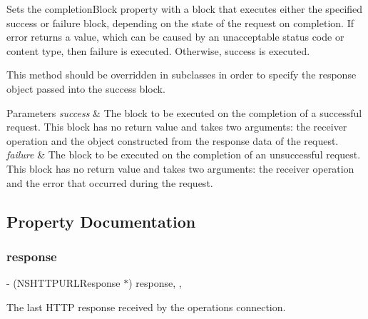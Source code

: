 Sets the {\ttfamily completion\+Block} property with a block that executes either the specified success or failure block, depending on the state of the request on completion. If {\ttfamily error} returns a value, which can be caused by an unacceptable status code or content type, then {\ttfamily failure} is executed. Otherwise, {\ttfamily success} is executed.

This method should be overridden in subclasses in order to specify the response object passed into the success block.


\begin{DoxyParams}{Parameters}
{\em success} & The block to be executed on the completion of a successful request. This block has no return value and takes two arguments\+: the receiver operation and the object constructed from the response data of the request. \\
\hline
{\em failure} & The block to be executed on the completion of an unsuccessful request. This block has no return value and takes two arguments\+: the receiver operation and the error that occurred during the request. \\
\hline
\end{DoxyParams}


\subsection{Property Documentation}
\mbox{\label{interface_a_f_h_t_t_p_request_operation_abfa028f296bc36526a873bd49df9dafa}} 
\subsubsection{\texorpdfstring{response}{response}}
{\footnotesize\ttfamily -\/ (N\+S\+H\+T\+T\+P\+U\+R\+L\+Response $\ast$) response\hspace{0.3cm}{\ttfamily [read]}, {\ttfamily [nonatomic]}, {\ttfamily [strong]}}

The last H\+T\+TP response received by the operation\textquotesingle{}s connection. \mbox{\label{interface_a_f_h_t_t_p_request_operation_a7418f7784dcaf21623ce588fb27734c3}} 
